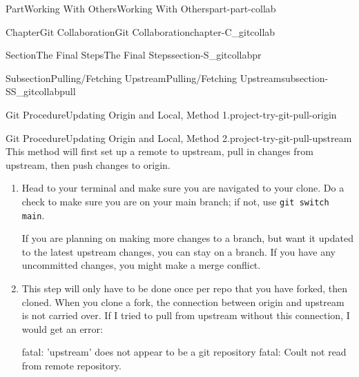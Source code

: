 \documentclass[oneside,10pt,]{book}
\newcommand{\mono}[1]{\texttt{#1}}
\begin{document}
\begin{partptx}{Part}{Working With Others}{}{Working With Others}{}{}{part-part-collab}
\begin{chapterptx}{Chapter}{Git Collaboration}{}{Git Collaboration}{}{}{chapter-C_gitcollab}
\begin{sectionptx}{Section}{The Final Steps}{}{The Final Steps}{}{}{section-S_gitcollabpr}
\begin{subsectionptx}{Subsection}{Pulling\slash{}Fetching Upstream}{}{Pulling\slash{}Fetching Upstream}{}{}{subsection-SS_gitcollabpull}
\begin{project}{Git Procedure}{Updating Origin and Local, Method 1.}{project-try-git-pull-origin}
\end{project}%
\begin{project}{Git Procedure}{Updating Origin and Local, Method 2.}{project-try-git-pull-upstream}%
%
%
%
%
%
%
%
%
This method will first set up a remote to upstream, pull in changes from upstream, then push changes to origin.%
\begin{enumerate}[font=\bfseries,label=(\alph*),ref=\alph*]%
\item{}Head to your terminal and make sure you are navigated to your clone. Do a check to make sure you are on your main branch; if not, use \mono{git switch main}.%
\par
If you are planning on making more changes to a branch, but want it updated to the latest upstream changes, you can stay on a branch. If you have any uncommitted changes, you might make a merge conflict.%
\item{}This step will only have to be done once per repo that you have forked, then cloned. When you clone a fork, the connection between origin and upstream is not carried over. If I tried to pull from upstream without this connection, I would get an error:%
\begin{console}{0}{1}{0}
fatal: 'upstream' does not appear to be a git repository
fatal: Coult not read from remote repository.


\end{console}
\end{enumerate}
\end{project}
\end{subsectionptx}
\end{sectionptx}
\end{chapterptx}
\end{partptx}
\end{document}
